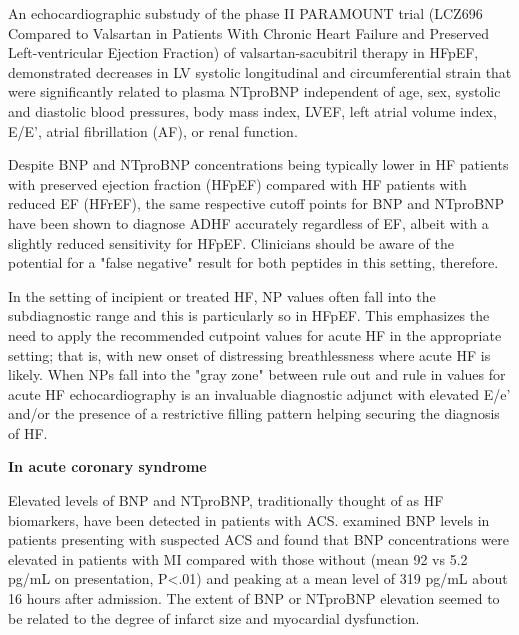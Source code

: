 \documentclass[14pt,a4paper,onecolumn]{extarticle}
\begin{document}
An echocardiographic substudy of the phase II PARAMOUNT trial (LCZ696 Compared to Valsartan in Patients With Chronic Heart Failure and Preserved Left-ventricular Ejection Fraction) of valsartan-sacubitril therapy in HFpEF, demonstrated decreases in LV systolic longitudinal and circumferential strain that were significantly related to plasma NTproBNP independent of age, sex, systolic and diastolic blood pressures, body mass index, LVEF, left atrial volume index, E/E’, atrial fibrillation (AF), or renal function. \citep{Kraigher-Krainer2014}

Despite BNP and NTproBNP concentrations being typically lower in HF patients with preserved ejection fraction (HFpEF) compared with HF patients with reduced EF (HFrEF), the same respective cutoff points for BNP and NTproBNP have been shown to diagnose ADHF accurately regardless of EF, albeit with a slightly reduced sensitivity for HFpEF.  Clinicians should be aware of the potential for a "false negative" result for both peptides in this setting, therefore. \citep{Maisel2003}


In the setting of incipient or treated HF, NP values often fall into the subdiagnostic range and this is particularly so in HFpEF. This emphasizes the need to apply the recommended cutpoint values for acute HF in the appropriate setting; that is, with new onset of distressing breathlessness where acute HF is likely. When NPs fall into the "gray zone" between rule out and rule in values for acute HF echocardiography is an invaluable diagnostic adjunct with elevated E/e’ and/or the presence of a restrictive filling pattern helping securing the diagnosis of HF. \citep{Richards2018}

\textbf{In acute coronary syndrome}

Elevated levels of BNP and NTproBNP, traditionally thought of as HF biomarkers, have been detected in patients with ACS. \citep{bib3135} examined BNP levels in patients presenting with suspected ACS and found that BNP concentrations were elevated in patients with MI compared with those without (mean 92 vs 5.2 pg/mL on presentation, P<.01) and peaking at a mean level of 319 pg/mL about 16 hours after admission. The extent of BNP or NTproBNP elevation seemed to be related to the degree of infarct size and myocardial dysfunction. \citep{bib3135}
\end{document}
